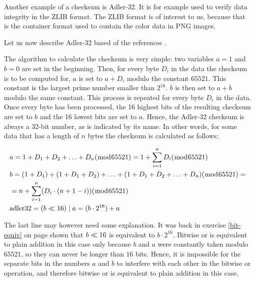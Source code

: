 \newcommand{\adlerchk}{Adler-32\xspace}

Another example of a checksum is \adlerchk. It is for example used to
verify data integrity in the ZLIB
format\cite{feldspar:_explan_deflat_algor}. The ZLIB format is of
interest to us, because that is the container format used to contain
the color data in PNG images.

Let us now describe \adlerchk based of the references
\cite{gailly96:_zlib_compr_data_format_specif,maxino:_revis_fletc_adler_check,DBLP:journals-tdsc-MaxinoK09_koopman}.

The algorithm to calculate the checksum is very simple: two variables
$a=1$ and $b=0$ are set in the beginning. Then, for every byte $D_i$
in the data the checksum is to be computed for, $a$ is set to $a +
D_i$ modulo the constant $65521$. This constant is the largest prime
number smaller than $2^{16}$. $b$ is then set to $a + b$ modulo the
same constant.  This process is repeated for every byte $D_i$ in the
data. Once every byte has been processed, the 16 highest bits of the
resulting checksum are set to $b$ and the 16 lowest bits are set to
$a$. Hence, the \adlerchk checksum is always a 32-bit number, as is
indicated by its name. In other words, for some data that has a length
of $n$ bytes the checksum is calculated as follows:

\begin{align*}
    & a = 1 + D_1 + D_2 + \ldots + D_n (\bmod{65521}) = 1 +
    \displaystyle\sum_{i = 1}^{n}D_i (\bmod{65521}) \\
    & b = (1 + D_1) + (1 + D_1 + D_2) + \ldots + (1 + D_1 + D_2 + \ldots +
    D_n) (\bmod{65521}) = \\
    & = n + \displaystyle\sum_{i = 1}^{n}(D_i \cdot (n + 1 - i))
    (\bmod{65521}) \\
    & \text{adler32} = (b \ll 16) \mathrel{|} a = (b \cdot 2^{16}) + a
\end{align*}

The last line may however need some explanation. It was back in
exercise \ref{bit-equiv} on page \pageref{bit-equiv} shown that $b
\ll 16$ is equivalent to $b \cdot 2^{16}$. Bitwise or is
equivalent to plain addition in this case only because $b$ and $a$
were constantly taken modulo $65521$, so they can never be longer than
$16$ bits. Hence, it is impossible for the separate bits in the
numbers $a$ and $b$ to interfere with each other in the bitwise or
operation, and therefore bitwise or is equivalent to plain addition in
this case.

